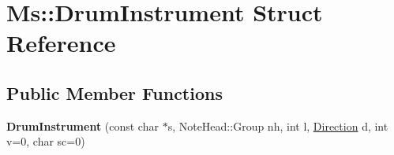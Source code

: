 \hypertarget{struct_ms_1_1_drum_instrument}{}\section{Ms\+:\+:Drum\+Instrument Struct Reference}
\label{struct_ms_1_1_drum_instrument}
\subsection*{Public Member Functions}
\begin{DoxyCompactItemize}
\item 
\mbox{\label{struct_ms_1_1_drum_instrument_ae4096c80153e35dc29fef6a628dd6827}} 
{\bfseries Drum\+Instrument} (const char $\ast$s, Note\+Head\+::\+Group nh, int l, \hyperlink{class_ms_1_1_direction}{Direction} d, int v=0, char sc=0)
\end{DoxyCompactItemize}
